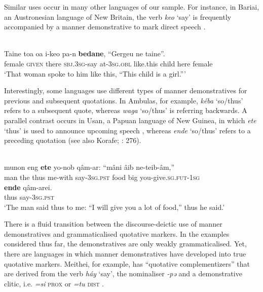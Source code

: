 \documentclass[output=paper,colorlinks,citecolor=brown]{langscibook}
\begin{document}
Similar uses occur in many other languages of our sample. For instance, in Bariai, an Austronesian language of New Britain, the verb \textit{keo} ‘say’ is frequently accompanied by a manner demonstrative to mark direct speech .

\ea\label{ex:diessel:13}
\\
\gll Taine toa   oa i-keo pa-n   \textbf{bedane}, “Gergeu  ne  taine”.\\
     female \textsc{given}   there \textsc{sbj.3sg}-say at-\textsc{3sg.obl}  like.this {\db}child  here  female\\
\glt ‘That woman spoke to him like this, “This child is a girl.”’
\z

Interestingly, some languages use different types of manner demonstratives for previous and subsequent quotations. In Ambulas, for example, \textit{kéba} ‘so/thus’ refers to a subsequent quote, whereas \textit{waga} ‘so/thus’ is referring backwards. A parallel contrast occurs in Usan, a Papuan language of New Guinea, in which \textit{ete} ‘thus’ is used to announce upcoming speech , whereas \textit{ende} ‘so/thus’ refers to a preceding quotation (see also Korafe; \citealt{Farr1999}: 276).

\ea\label{ex:diessel:14}
\\
\gll munon eng  \textbf{ete} yo-nob qâm-ar:  “mâni  âib  ne-teib-âm,”\\
     man   the  thus me-with say-\textsc{3sg.pst}   {\db}food  big  you-give.\textsc{sg.fut-1sg}\\
\gll \textbf{ende}  qâm-arei.\\
     thus    say-\textsc{3sg.pst}\\
\glt ‘The man said thus to me: “I will give you a lot of food,” thus he said.’
\z

There is a fluid transition between the discourse-deictic use of manner demonstratives and grammaticalised quotative markers. In the examples considered thus far, the demonstratives are only weakly grammaticalised. Yet, there are languages in which manner demonstratives have developed into true quotative markers. Meithei, for example, has “quotative complementizers” \citep[190]{Chelliah1997} that are derived from the verb \textit{háy}\textbf{ }‘say’, the nominaliser \textit{-pə} and a demonstrative clitic, i.e. \textit{=si} \textsc{prox} or \textit{=tu} \textsc{dist} .
\end{document}
